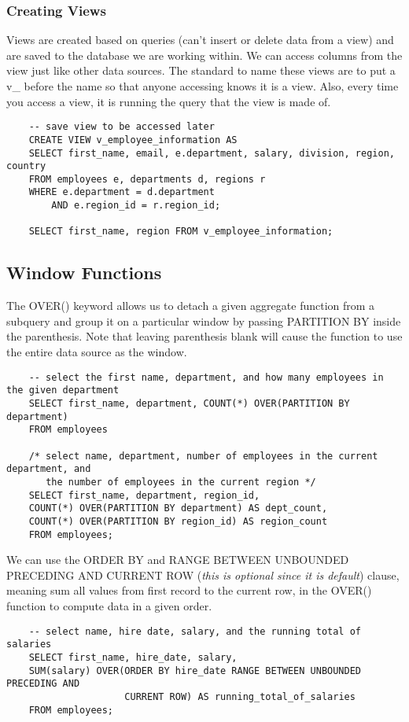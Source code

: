 \documentclass[11pt, a4paper]{article}
\begin{document}
\begin{spacing}{1.1}
	\subsubsection{Creating Views}
	Views are created based on queries (can't insert or delete data from a view) and are saved to the database we are working within. We can access columns from the view just like other data sources. The standard to name these views are to put a v\_ before the name so that anyone accessing knows it is a view. Also, every time you access a view, it is running the query that the view is made of. 
	\begin{lstlisting}
	-- save view to be accessed later
	CREATE VIEW v_employee_information AS
	SELECT first_name, email, e.department, salary, division, region, country
	FROM employees e, departments d, regions r
	WHERE e.department = d.department
		AND e.region_id = r.region_id;
	
	SELECT first_name, region FROM v_employee_information;	\end{lstlisting} \vspace*{3mm}
	
	\subsection{Window Functions}
	The OVER() keyword allows us to detach a given aggregate function from a subquery and group it on a particular window by passing PARTITION BY inside the parenthesis. Note that leaving parenthesis blank will cause the function to use the entire data source as the window.
	\begin{lstlisting}
	-- select the first name, department, and how many employees in the given department
	SELECT first_name, department, COUNT(*) OVER(PARTITION BY department)
	FROM employees
	
	/* select name, department, number of employees in the current department, and 
	   the number of employees in the current region */
	SELECT first_name, department, region_id,
	COUNT(*) OVER(PARTITION BY department) AS dept_count,
	COUNT(*) OVER(PARTITION BY region_id) AS region_count
	FROM employees;	\end{lstlisting} \newpage
	\noindent We can use the ORDER BY and RANGE BETWEEN UNBOUNDED PRECEDING AND CURRENT ROW (\textit{this is optional since it is default}) clause, meaning sum all values from first record to the current row, in the OVER() function to compute data in a given order. 
	\begin{lstlisting}
	-- select name, hire date, salary, and the running total of salaries 
	SELECT first_name, hire_date, salary,
	SUM(salary) OVER(ORDER BY hire_date RANGE BETWEEN UNBOUNDED PRECEDING AND 
	                 CURRENT ROW) AS running_total_of_salaries
	FROM employees;
	

\end{lstlisting}
\end{spacing}
\end{document}
